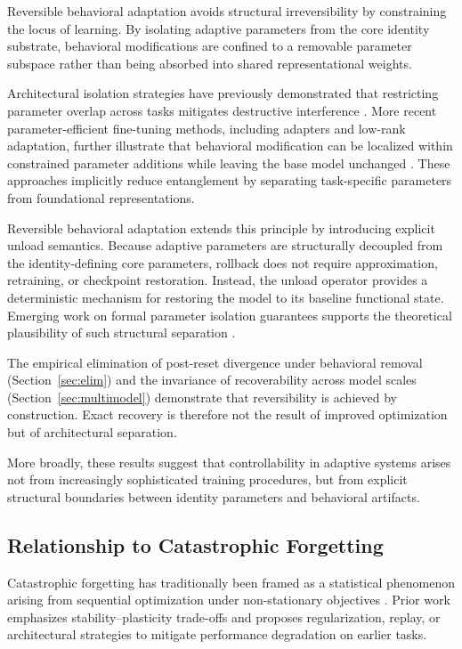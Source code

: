 \documentclass[10pt]{article}
\begin{document}
	Reversible behavioral adaptation avoids structural irreversibility by constraining the locus of learning. By isolating adaptive parameters from the core identity substrate, behavioral modifications are confined to a removable parameter subspace rather than being absorbed into shared representational weights.
	
	Architectural isolation strategies have previously demonstrated that restricting parameter overlap across tasks mitigates destructive interference \cite{rusu2016progressive,mallya2018packnet}. More recent parameter-efficient fine-tuning methods, including adapters and low-rank adaptation, further illustrate that behavioral modification can be localized within constrained parameter additions while leaving the base model unchanged \cite{houlsby2019adapter,hu2021lora}. These approaches implicitly reduce entanglement by separating task-specific parameters from foundational representations.
	
	Reversible behavioral adaptation extends this principle by introducing explicit unload semantics. Because adaptive parameters are structurally decoupled from the identity-defining core parameters, rollback does not require approximation, retraining, or checkpoint restoration. Instead, the unload operator provides a deterministic mechanism for restoring the model to its baseline functional state. Emerging work on formal parameter isolation guarantees supports the theoretical plausibility of such structural separation \cite{lanzillotta2023isolation}.
	
	The empirical elimination of post-reset divergence under behavioral removal (Section~\ref{sec:elim}) and the invariance of recoverability across model scales (Section~\ref{sec:multimodel}) demonstrate that reversibility is achieved by construction. Exact recovery is therefore not the result of improved optimization but of architectural separation.
	
	More broadly, these results suggest that controllability in adaptive systems arises not from increasingly sophisticated training procedures, but from explicit structural boundaries between identity parameters and behavioral artifacts.
	
	\subsection{Relationship to Catastrophic Forgetting}
	\label{sec:analysis_forgetting}
	
	Catastrophic forgetting has traditionally been framed as a statistical phenomenon arising from sequential optimization under non-stationary objectives \cite{kirkpatrick2017ewc,delange2021continual}. Prior work emphasizes stability--plasticity trade-offs and proposes regularization, replay, or architectural strategies to mitigate performance degradation on earlier tasks.
	
\end{document}
